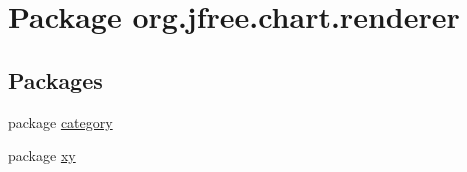 \hypertarget{namespaceorg_1_1jfree_1_1chart_1_1renderer}{}\section{Package org.\+jfree.\+chart.\+renderer}
\label{namespaceorg_1_1jfree_1_1chart_1_1renderer}
\subsection*{Packages}
\begin{DoxyCompactItemize}
\item 
package \mbox{\hyperlink{namespaceorg_1_1jfree_1_1chart_1_1renderer_1_1category}{category}}
\item 
package \mbox{\hyperlink{namespaceorg_1_1jfree_1_1chart_1_1renderer_1_1xy}{xy}}
\end{DoxyCompactItemize}
